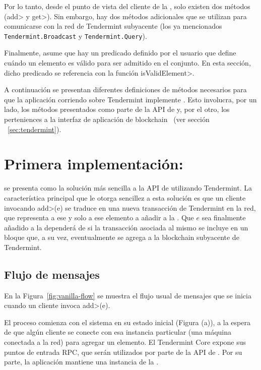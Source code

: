 
Por lo tanto, desde el punto de vista del cliente de la \setchain, solo existen dos
métodos (\<add> y \<get>).
%
Sin embargo, hay dos métodos adicionales que se utilizan para comunicarse con la
red de Tendermint subyacente (los ya mencionados \texttt{Tendermint.Broadcast} y
\texttt{Tendermint.Query}).
%

Finalmente, \setchain asume que hay un predicado definido por el usuario que define
cuándo un elemento es válido para ser admitido en el conjunto.
%
En esta sección, dicho predicado se referencia con la función \<isValidElement>.

%
A continuación se presentan diferentes definiciones de métodos
necesarios para que la aplicación corriendo sobre Tendermint implemente \setchain.
Esto involucra, por un lado, los métodos presentados como parte de la API de
\setchain y, por el otro, los perteniences a la interfaz de aplicación de
blockchain ~(ver sección ~\ref{sec:tendermint}).

\section{Primera implementación: \vanilla}\label{sec:vanilla}

\vanilla se presenta como la solución más sencilla a la API de \setchain
utilizando Tendermint.
%
La característica principal que le otorga sencillez a esta solución es que
un cliente invocando \<add>(e) se traduce en una nueva transacción de Tendermint en la red,
que representa a ese y solo a ese elemento a añadir a la \setchain.
%
Que $e$ sea finalmente añadido a la \setchain dependerá de si la transacción asociada
al mismo se incluye en un bloque que, a su vez, eventualmente se agrega a la blockchain
subyacente de Tendermint. 

\subsection{Flujo de mensajes}
En la Figura~\ref{fig:vanilla-flow} se muestra el flujo usual de mensajes que se inicia
cuando un cliente invoca \<add>(e).
%

El proceso comienza con el sistema en su estado inicial (Figura (a)), a la espera de que algún cliente
se conecte con esa instancia particular (una máquina conectada a la red) para agregar un elemento.
El Tendermint Core expone sus puntos de entrada RPC, que serán utilizados por parte de la API de
\setchain. Por su parte, la aplicación mantiene una instancia de la \setchain.
%

